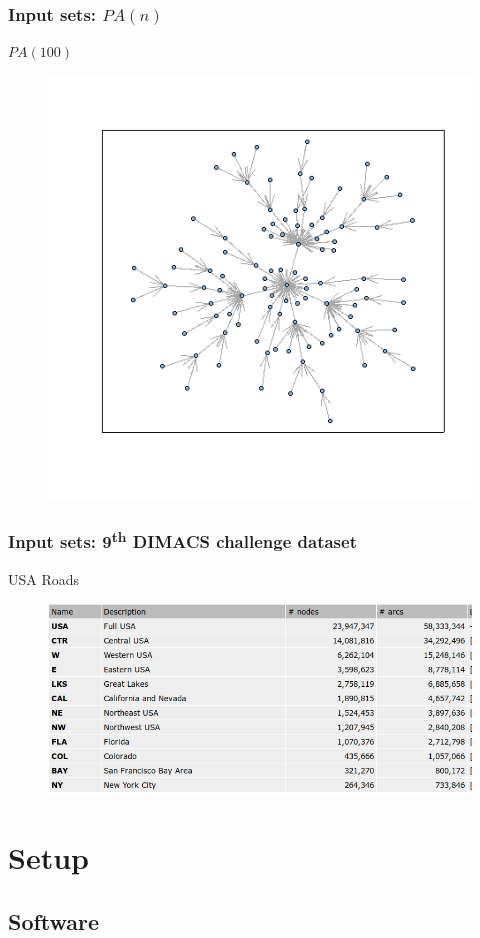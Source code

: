 \documentclass{beamer}
\begin{document}
\begin{frame}
\frametitle{Input sets: $PA(n)$}
\centering
$PA(100)$
\begin{figure}
 \includegraphics[width=.7\textwidth]{graphPA.png}
\end{figure}
\end{frame}

\begin{frame}
\frametitle{Input sets: 9\textsuperscript{th} DIMACS challenge dataset}
\centering
USA Roads
\begin{figure}
 \includegraphics[width=.7\textwidth]{graphUSA.png}
\end{figure}
\end{frame}


\section{Setup}

\subsection{Software}
\end{document}
